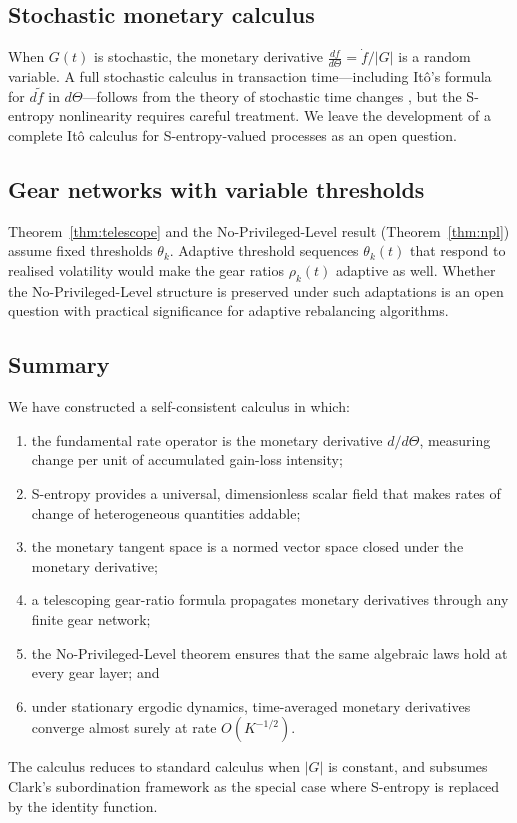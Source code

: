 \documentclass[twocolumn,11pt,a4paper]{article}
\theoremstyle{thmstyle}
\theoremstyle{definition}
\theoremstyle{remark}
\newcommand{\Gain}{G}                        %
\newcommand{\Clock}{\Theta}                  %
\newcommand{\Mdiff}[1]{\frac{d#1}{d\Clock}} %
\begin{document}
\subsection{Stochastic monetary calculus}

When $\Gain(t)$ is stochastic, the monetary derivative
$\Mdiff{f} = \dot{f}/|\Gain|$ is a random variable.  A
full stochastic calculus in transaction time---including
It\^o's formula for $d\tilde{f}$ in $d\Clock$---follows
from the theory of stochastic time changes
\citep{KaratzasShreve1991}, but the S-entropy nonlinearity
requires careful treatment.  We leave the development of
a complete It\^o calculus for S-entropy-valued processes
as an open question.

\subsection{Gear networks with variable thresholds}

Theorem~\ref{thm:telescope} and the No-Privileged-Level
result (Theorem~\ref{thm:npl}) assume fixed thresholds
$\theta_{k}$.  Adaptive threshold sequences
$\theta_{k}(t)$ that respond to realised volatility would
make the gear ratios $\rho_{k}(t)$ adaptive as well.
Whether the No-Privileged-Level structure is preserved
under such adaptations is an open question with practical
significance for adaptive rebalancing algorithms.

\subsection{Summary}

We have constructed a self-consistent calculus in which:
\begin{enumerate}[nosep]
\item the fundamental rate operator is the monetary
      derivative $d/d\Clock$, measuring change per unit
      of accumulated gain-loss intensity;
\item S-entropy provides a universal, dimensionless scalar
      field that makes rates of change of heterogeneous
      quantities addable;
\item the monetary tangent space is a normed vector space
      closed under the monetary derivative;
\item a telescoping gear-ratio formula propagates
      monetary derivatives through any finite gear network;
\item the No-Privileged-Level theorem ensures that the
      same algebraic laws hold at every gear layer; and
\item under stationary ergodic dynamics, time-averaged
      monetary derivatives converge almost surely at rate
      $O(K^{-1/2})$.
\end{enumerate}
The calculus reduces to standard calculus when $|\Gain|$
is constant, and subsumes Clark's subordination framework
as the special case where S-entropy is replaced by the
identity function.

\vspace{6pt}


\end{document}
